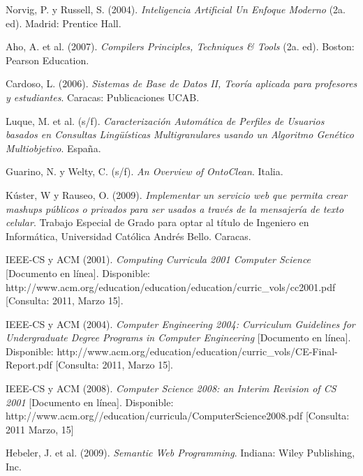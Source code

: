 \begin{thebibliography}{20}
     Norvig, P. y Russell, S. (2004). \emph{Inteligencia Artificial Un Enfoque Moderno} (2a. ed). Madrid: Prentice Hall.

     Aho, A. et al. (2007). \emph{Compilers Principles, Techniques & Tools} (2a. ed). Boston: Pearson Education.

     Cardoso, L. (2006). \emph{Sistemas de Base de Datos II, Teoría aplicada para profesores y estudiantes}. Caracas: Publicaciones UCAB.

     Luque, M. et al. (s/f). \emph{Caracterización Automática de Perfiles de Usuarios basados en Consultas Lingüísticas Multigranulares usando un Algoritmo Genético Multiobjetivo}. España.

 Guarino, N. y Welty, C. (s/f). \emph{An Overview of OntoClean}. Italia.

 Kúster, W y Rauseo, O. (2009). \emph{Implementar un servicio web que permita crear mashups públicos o privados para ser usados a través de la mensajería de texto celular}. Trabajo Especial de Grado para optar al título de Ingeniero en Informática, Universidad Católica Andrés Bello. Caracas.

 IEEE-CS y ACM (2001). \emph{Computing Curricula 2001 Computer Science} [Documento en línea]. Disponible: http://www.acm.org/education/education/education/curric\_vols/cc2001.pdf [Consulta: 2011, Marzo 15].

 IEEE-CS y ACM (2004). \emph{Computer Engineering 2004: Curriculum Guidelines for Undergraduate Degree Programs in Computer Engineering} [Documento en línea]. Disponible: http://www.acm.org/education/education/curric\_vols/CE-Final-Report.pdf [Consulta: 2011, Marzo 15].

 IEEE-CS y ACM (2008). \emph{Computer Science 2008: an Interim Revision of CS 2001} [Documento en línea]. Disponible: http://www.acm.org//education/curricula/ComputerScience2008.pdf [Consulta: 2011 Marzo, 15]

 Hebeler, J. et al. (2009). \emph{Semantic Web Programming}. Indiana: Wiley Publishing, Inc.

\end{thebibliography}
